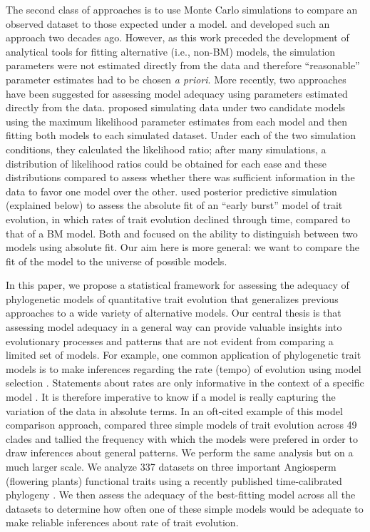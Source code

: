 The second class of approaches is to use Monte Carlo simulations to compare an observed dataset to those expected under a model. \citet{Garland1993} and \citet{Diaz1996} developed such an approach two decades ago. However, as this work preceded the development of analytical tools for fitting alternative (i.e., non-BM) models, the simulation parameters were not estimated directly from the data and therefore ``reasonable'' parameter estimates had to be chosen \emph{a priori}. More recently, two approaches have been suggested for assessing model adequacy using parameters estimated directly from the data. \citet{Boettiger2012} proposed simulating data under two candidate models using the maximum likelihood parameter estimates from each model and then fitting both models to each simulated dataset. Under each of the two simulation conditions, they calculated the likelihood ratio; after many simulations, a distribution of likelihood ratios could be obtained for each ease and these distributions compared to assess whether there was sufficient information in the data to favor one model over the other. 
\citet{SlaterPennell} used posterior predictive simulation (explained below) to assess the absolute fit of an ``early burst'' model of trait evolution, in which rates of trait evolution declined through time, compared to that of a BM model. Both \citet{Boettiger2012} and \citet{SlaterPennell} focused on the ability to distinguish between two models using absolute fit. Our aim here is more general: we want to compare the fit of the model to the universe of possible models. 

In this paper, we propose a statistical framework for assessing the adequacy of phylogenetic models of quantitative trait evolution that generalizes previous approaches to a wide variety of alternative models. Our central thesis is that assessing model adequacy in a general way can provide valuable insights into evolutionary processes and patterns that are not evident from comparing a limited set of models. For example, one common application of phylogenetic trait models is to make inferences regarding the rate (tempo) of evolution using model selection \citep[e.g.,][]{Mooers1999, Harmon2010, Hunt2012, SlaterMEE}. Statements about rates are only informative in the context of a specific model \citep{Hunt2012}. It is therefore imperative to know if a model is really capturing the variation of the data in absolute terms. In an oft-cited example of this model comparison approach, \citet{Harmon2010} compared three simple models of trait evolution across 49 clades and tallied the frequency with which the models were prefered in order to draw inferences about general patterns. We perform the same analysis but on a much larger scale. We analyze 337 datasets on three important Angiosperm (flowering plants) functional traits using a recently published time-calibrated phylogeny \citep{Zanne2013}. We then assess the adequacy of the best-fitting model across all the datasets to determine how often one of these simple models would be adequate to make reliable inferences about rate of trait evolution.
 
